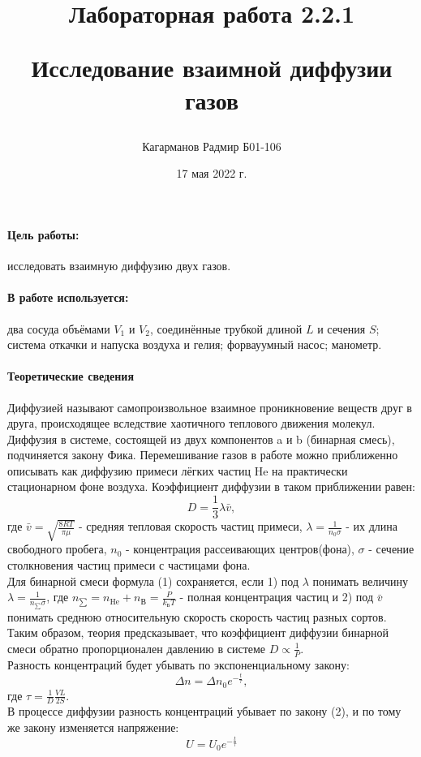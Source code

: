 \documentclass[a4paper,12pt]{article}
\title{Лабораторная работа 2.2.1 

Исследование взаимной диффузии газов}
\author{Кагарманов Радмир Б01-106}
\date{17 мая 2022 г.}
\begin{document}
\maketitle
\thispagestyle{empty}
\newpage
\setcounter{page}{1}
\paragraph{Цель работы:} исследовать взаимную диффузию двух газов.
\paragraph{В работе используется:} два сосуда объёмами $V_1$ и $V_2$, соединённые трубкой длиной $L$ и сечения $S$; система откачки и напуска воздуха и гелия; форвауумный насос; манометр.

\paragraph{Теоретические сведения\\} Диффузией называют самопроизвольное взаимное проникновение веществ друг в друга, происходящее вследствие хаотичного теплового движения молекул. \\
Диффузия в системе, состоящей из двух компонентов a и b (бинарная
смесь), подчиняется закону Фика. Перемешивание газов в работе можно приближенно описывать как диффузию примеси лёгких частиц He на практически стационарном фоне воздуха. Коэффициент диффузии в таком приближении равен:
\begin{equation}
    D=\frac{1}{3}\lambda \bar v,
\end{equation}
где $\bar v=\sqrt{\frac{8RT}{\pi \mu}}$ - средняя тепловая скорость частиц примеси, $\lambda = \frac{1}{n_0 \sigma}$ - их длина свободного пробега, $n_0$ - концентрация рассеивающих центров(фона), $\sigma$ - сечение столкновения частиц примеси с частицами фона.\\
Для бинарной смеси формула (1) сохраняется, если 1) под $\lambda$ понимать величину $\lambda = \frac{1}{n_{\sum} \sigma}$, где $n_{\sum} = n_{\text{He}} + n_{\text{В}} = \frac{P}{k_{Б} T}$ - полная концентрация частиц и 2) под $\bar v$ понимать среднюю относительную скорость скорость частиц разных сортов. \\
Таким образом, теория предсказывает, что коэффициент диффузии бинарной смеси обратно пропорционален давлению в системе $D\propto \frac{1}{P}$.\\
Разность концентраций будет убывать по экспоненциальному закону:
\begin{equation}
    \Delta n=\Delta n_0 e^{-\frac{t}{\tau}},
\end{equation}
где $\tau=\frac{1}{D}\frac{VL}{2S}$.\\
В процессе
диффузии разность концентраций убывает по закону (2), и по тому
же закону изменяется напряжение:
\begin{equation}
    U=U_0 e^{-\frac{t}{\tau}}
\end{equation}
\end{document}
